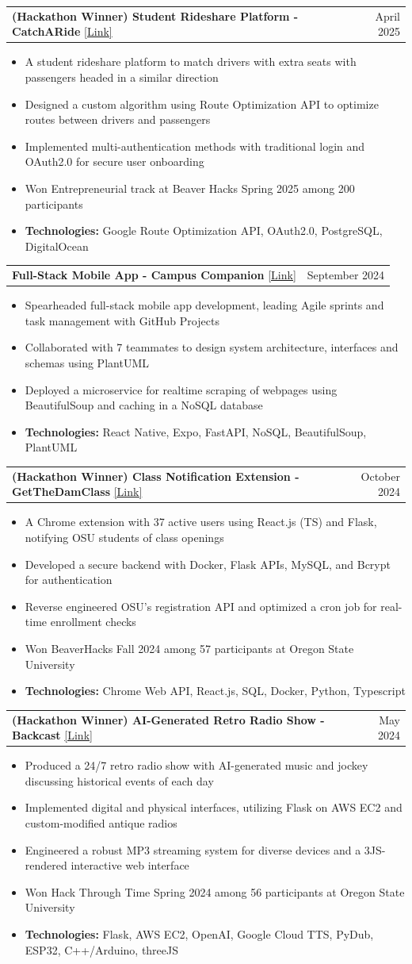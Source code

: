 \documentclass[letterpaper,11pt]{article}
\makeatletter
\newcommand{\resumeItem}[1]{
\item\small{
    {#1 \vspace{-2pt}}
  }
}
\newcommand{\resumeProjectHeading}[2]{
\item
  \begin{tabular*}{0.97\textwidth}{l@{\extracolsep{\fill}}r}
    \small#1 & #2 \\
  \end{tabular*}\vspace{-7pt}
}
\newcommand{\resumeItemListStart}{
\begin{itemize}}
\newcommand{\resumeItemListEnd}{
\end{itemize}\vspace{-5pt}}
\makeatother
\begin{document}
\resumeProjectHeading
{\textbf{(Hackathon Winner) Student Rideshare Platform - CatchARide} \href{https://devpost.com/software/catcharide}{[Link]}}{April 2025}
\resumeItemListStart
\resumeItem{A student rideshare platform to match drivers with extra seats with passengers headed in a similar direction}
\resumeItem{Designed a custom algorithm using Route Optimization API to optimize routes between drivers and passengers}
\resumeItem{Implemented multi-authentication methods with traditional login and OAuth2.0 for secure user onboarding}
\resumeItem{Won Entrepreneurial track at Beaver Hacks Spring 2025 among 200 participants}
\resumeItem{\textbf{Technologies:} Google Route Optimization API, OAuth2.0, PostgreSQL, DigitalOcean}
\resumeItemListEnd

\resumeProjectHeading
{\textbf{Full-Stack Mobile App - Campus Companion} \href{https://github.com/Carson274/CampusView}{[Link]}}{September 2024}
\resumeItemListStart
\resumeItem{Spearheaded full-stack mobile app development, leading Agile sprints and task management with GitHub Projects}
\resumeItem{Collaborated with 7 teammates to design system architecture, interfaces and schemas using PlantUML}
\resumeItem{Deployed a microservice for realtime scraping of webpages using BeautifulSoup and caching in a NoSQL database}
\resumeItem{\textbf{Technologies:} React Native, Expo, FastAPI, NoSQL, BeautifulSoup, PlantUML}
\resumeItemListEnd

\resumeProjectHeading
{\textbf{(Hackathon Winner) Class Notification Extension - GetTheDamClass} \href{https://devpost.com/software/getthedamclass}{[Link]}}{October 2024}
\resumeItemListStart
\resumeItem{A Chrome extension with 37 active users using React.js (TS) and Flask, notifying OSU students of class openings}
\resumeItem{Developed a secure backend with Docker, Flask APIs, MySQL, and Bcrypt for authentication}
\resumeItem{Reverse engineered OSU's registration API and optimized a cron job for real-time enrollment checks}
\resumeItem{Won BeaverHacks Fall 2024 among 57 participants at Oregon State University}
\resumeItem{\textbf{Technologies:} Chrome Web API, React.js, SQL, Docker, Python, Typescript}
\resumeItemListEnd

\resumeProjectHeading
{\textbf{(Hackathon Winner) AI-Generated Retro Radio Show - Backcast} \href{https://devpost.com/software/timeless-w1ze62}{[Link]}}{May 2024}
\resumeItemListStart
\resumeItem{Produced a 24/7 retro radio show with AI-generated music and jockey discussing historical events of each day}
\resumeItem{Implemented digital and physical interfaces, utilizing Flask on AWS EC2 and custom-modified antique radios}
\resumeItem{Engineered a robust MP3 streaming system for diverse devices and a 3JS-rendered interactive web interface}
\resumeItem{Won Hack Through Time Spring 2024 among 56 participants at Oregon State University}
\resumeItem{\textbf{Technologies:} Flask, AWS EC2, OpenAI, Google Cloud TTS, PyDub, ESP32, C++/Arduino, threeJS}
\resumeItemListEnd
\end{document}
